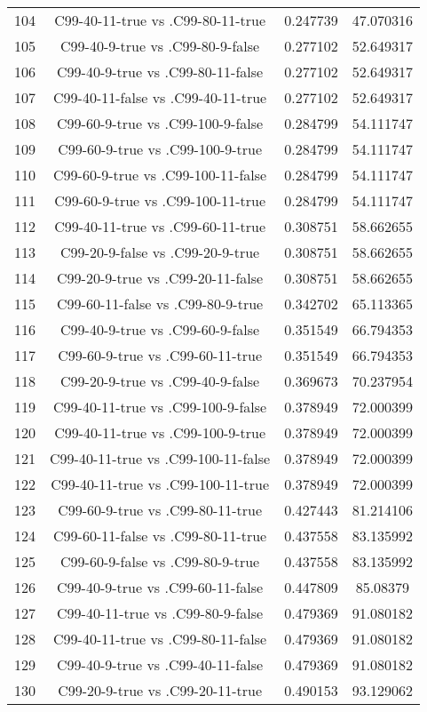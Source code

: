 \documentclass[a4paper,10pt]{article}
\begin{document}
\begin{landscape}
\begin{table}[!htp]
\begin{tabular}{cccc}
104&C99-40-11-true vs .C99-80-11-true&0.247739&47.070316\\
105&C99-40-9-true vs .C99-80-9-false&0.277102&52.649317\\
106&C99-40-9-true vs .C99-80-11-false&0.277102&52.649317\\
107&C99-40-11-false vs .C99-40-11-true&0.277102&52.649317\\
108&C99-60-9-true vs .C99-100-9-false&0.284799&54.111747\\
109&C99-60-9-true vs .C99-100-9-true&0.284799&54.111747\\
110&C99-60-9-true vs .C99-100-11-false&0.284799&54.111747\\
111&C99-60-9-true vs .C99-100-11-true&0.284799&54.111747\\
112&C99-40-11-true vs .C99-60-11-true&0.308751&58.662655\\
113&C99-20-9-false vs .C99-20-9-true&0.308751&58.662655\\
114&C99-20-9-true vs .C99-20-11-false&0.308751&58.662655\\
115&C99-60-11-false vs .C99-80-9-true&0.342702&65.113365\\
116&C99-40-9-true vs .C99-60-9-false&0.351549&66.794353\\
117&C99-60-9-true vs .C99-60-11-true&0.351549&66.794353\\
118&C99-20-9-true vs .C99-40-9-false&0.369673&70.237954\\
119&C99-40-11-true vs .C99-100-9-false&0.378949&72.000399\\
120&C99-40-11-true vs .C99-100-9-true&0.378949&72.000399\\
121&C99-40-11-true vs .C99-100-11-false&0.378949&72.000399\\
122&C99-40-11-true vs .C99-100-11-true&0.378949&72.000399\\
123&C99-60-9-true vs .C99-80-11-true&0.427443&81.214106\\
124&C99-60-11-false vs .C99-80-11-true&0.437558&83.135992\\
125&C99-60-9-false vs .C99-80-9-true&0.437558&83.135992\\
126&C99-40-9-true vs .C99-60-11-false&0.447809&85.08379\\
127&C99-40-11-true vs .C99-80-9-false&0.479369&91.080182\\
128&C99-40-11-true vs .C99-80-11-false&0.479369&91.080182\\
129&C99-40-9-true vs .C99-40-11-false&0.479369&91.080182\\
130&C99-20-9-true vs .C99-20-11-true&0.490153&93.129062\\

\end{tabular}
\end{table}
\end{landscape}
\end{document}

